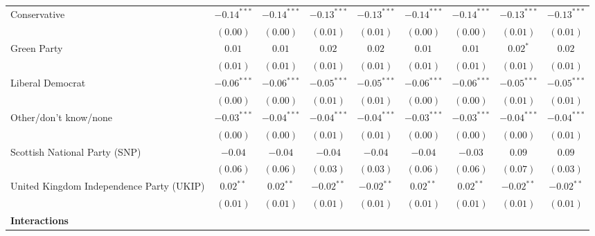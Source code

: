 \documentclass[12pt, letter]{scrartcl}
\begin{document}
\begin{tiny}
\begin{longtable}{lcccccccc}
Conservative                                & $-0.14^{***}$ & $-0.14^{***}$ & $-0.13^{***}$ & $-0.13^{***}$ & $-0.14^{***}$ & $-0.14^{***}$ & $-0.13^{***}$ & $-0.13^{***}$ \\
                                            & $(0.00)$      & $(0.00)$      & $(0.01)$      & $(0.01)$      & $(0.00)$      & $(0.00)$      & $(0.01)$      & $(0.01)$      \\
Green Party                                 & $0.01$        & $0.01$        & $0.02$        & $0.02$        & $0.01$        & $0.01$        & $0.02^{*}$    & $0.02$        \\
                                            & $(0.01)$      & $(0.01)$      & $(0.01)$      & $(0.01)$      & $(0.01)$      & $(0.01)$      & $(0.01)$      & $(0.01)$      \\
Liberal Democrat                            & $-0.06^{***}$ & $-0.06^{***}$ & $-0.05^{***}$ & $-0.05^{***}$ & $-0.06^{***}$ & $-0.06^{***}$ & $-0.05^{***}$ & $-0.05^{***}$ \\
                                            & $(0.00)$      & $(0.00)$      & $(0.01)$      & $(0.01)$      & $(0.00)$      & $(0.00)$      & $(0.01)$      & $(0.01)$      \\
Other/don't know/none                       & $-0.03^{***}$ & $-0.04^{***}$ & $-0.04^{***}$ & $-0.04^{***}$ & $-0.03^{***}$ & $-0.03^{***}$ & $-0.04^{***}$ & $-0.04^{***}$ \\
                                            & $(0.00)$      & $(0.00)$      & $(0.01)$      & $(0.01)$      & $(0.00)$      & $(0.00)$      & $(0.00)$      & $(0.01)$      \\
Scottish National Party (SNP)               & $-0.04$       & $-0.04$       & $-0.04$       & $-0.04$       & $-0.04$       & $-0.03$       & $0.09$        & $0.09$        \\
                                            & $(0.06)$      & $(0.06)$      & $(0.03)$      & $(0.03)$      & $(0.06)$      & $(0.06)$      & $(0.07)$      & $(0.03)$      \\
United Kingdom Independence Party (UKIP)    & $0.02^{**}$   & $0.02^{**}$   & $-0.02^{**}$  & $-0.02^{**}$  & $0.02^{**}$   & $0.02^{**}$   & $-0.02^{**}$  & $-0.02^{**}$  \\
                                            & $(0.01)$      & $(0.01)$      & $(0.01)$      & $(0.01)$      & $(0.01)$      & $(0.01)$      & $(0.01)$      & $(0.01)$      \\
\multicolumn{5}{l}{\textbf{Interactions}} \\[5pt]

\end{longtable}
\end{tiny}
\end{document}
